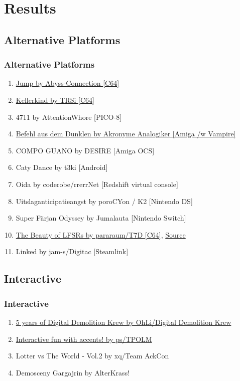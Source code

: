 \documentclass{beamer}
\begin{document}
\section{Results}


\subsection{Alternative Platforms}
\begin{frame}
  \frametitle{Alternative Platforms}
  \begin{enumerate}
  \item \href{https://www.pouet.net/prod.php?which=77670}{Jump by Abyss-Connection [C64]}
  \item \href{https://www.pouet.net/prod.php?which=77701}{Kellerkind by TRSi [C64]}
  \item 4711 by AttentionWhore [PICO-8]
  \item \href{https://www.twitch.tv/videos/298895783?t=04h56m03s}{Befehl aus dem Dunklen by Akronyme Analogiker [Amiga /w Vampire]}
  \item COMPO GUANO by DESIRE [Amiga OCS]
  \item Caty Dance by t3ki [Android]
  \item Oida by coderobe/rrerrNet [Redshift virtual console]
  \item Uitslaganticipatieangst by poroCYon / K2 [Nintendo DS]
  \item Super Färjan Odyssey by Jumalauta [Nintendo Switch]
  \item \href{https://csdb.dk/release/?id=167237}{The Beauty of LFSRs by pararaum/T7D [C64]}, \href{https://github.com/pararaum/beauty_of_LFSR}{Source}
  \item Linked by jam-s/Digitac [Steamlink]
  \end{enumerate}
\end{frame}


\subsection{Interactive}
\begin{frame}
  \frametitle{Interactive}
  \begin{enumerate}
  \item \href{https://demozoo.org/productions/191979/}{5 years of Digital Demolition Krew by OhLi/Digital Demolition Krew}
  \item \href{https://www.twitch.tv/videos/298895783?t=04h11m30s}{Interactive fun with accents! by ps/TPOLM}
  \item Lotter vs The World - Vol.2 by xq/Team AckCon
  \item Demosceny Gargajrin by AlterKrass!
  \end{enumerate}
\end{frame}
\end{document}

